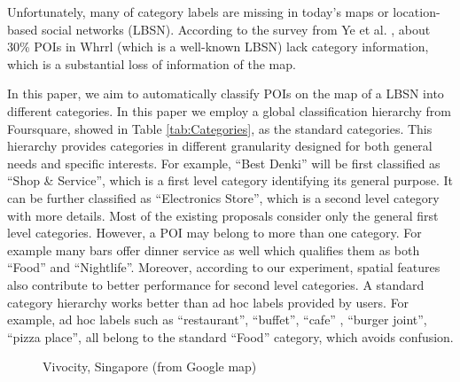 Unfortunately, many of category labels are missing in today's maps
or location-based social networks (LBSN).
According to the survey from Ye et al. \cite{yemao}, about 30\% POIs in
Whrrl (which is a well-known LBSN) lack category information,
which is a substantial loss of information of the map.

In this paper, we aim to automatically classify POIs on the map of a LBSN
into different categories. In this paper we employ a global classification
hierarchy from Foursquare, showed in Table \ref{tab:Categories},
as the standard categories. This hierarchy provides categories in different
granularity designed for both general needs and specific interests.
For example, ``Best Denki'' will be first classified as ``Shop \& Service'',
which is a first level category identifying its general purpose.
It can be further classified as ``Electronics Store'',
which is a second level category with more details.
Most of the existing proposals consider only
the general first level categories. However, 
a POI may belong to more than one category.
For example many bars offer dinner service as well
which qualifies them as both ``Food'' and ``Nightlife''.
Moreover, according to our experiment,
spatial features also contribute to better performance for
second level categories. 
A standard category hierarchy  works better than
ad hoc labels provided by users. For example, ad hoc labels such as
``restaurant'', ``buffet'', ``cafe'' , ``burger joint'', ``pizza place'',
all belong to the standard ``Food'' category, which avoids confusion.

\begin{figure}[ht]
\caption{Vivocity, Singapore (from Google map)}
\label{fig:vivo}       %
\end{figure}

